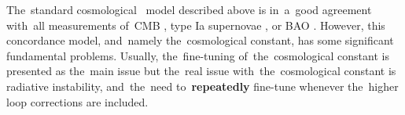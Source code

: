 
\label{ssec:lambda}
The~standard cosmological \LCDM\ model described above is in~a~good agreement with~all measurements of~CMB \parencite{planck_cosm}, type Ia supernovae \parencite{Abbott_2019}, or BAO \parencite{BAO_results}. However, this concordance model, and~namely the~cosmological constant, has some significant fundamental problems. Usually, the~fine-tuning of~the~cosmological constant is presented as the~main issue but the~real issue with~the~cosmological constant is radiative instability, and~the~need to~\textbf{repeatedly} fine-tune whenever the~higher loop corrections are included.%

